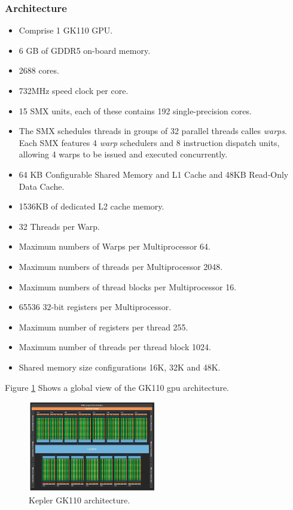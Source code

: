 \subsubsection{Architecture}
\begin{itemize}
    \item Comprise 1 GK110 GPU\cite{gpu_specs}.
    \item 6 GB of GDDR5 on-board memory\cite{gpu_specs}.
    \item 2688 cores\cite{gpu_specs}.
    \item 732MHz speed clock per core\cite{gpu_specs}.
    \item 15 SMX units, each of these contains 192 single-precision cores\cite{gpu_specs1}.
    \item The SMX schedules threads in groups of 32 parallel threads calles \emph{warps}. Each SMX features 4 \emph{warp}
        schedulers and 8 instruction dispatch units, allowing 4 warps to be issued and executed concurrently\cite{gpu_specs1}.
    \item 64 KB Configurable Shared Memory and L1 Cache and 48KB Read‐Only Data Cache\cite{gpu_specs1}.
    \item 1536KB of dedicated L2 cache memory\cite{gpu_specs1}.
    \item 32 Threads per Warp\cite{gpu_specs1}.
    \item Maximum numbers of Warps per Multiprocessor 64\cite{gpu_specs1}.
    \item Maximum numbers of threads per Multiprocessor 2048\cite{gpu_specs1}.
    \item Maximum numbers of thread blocks per Multiprocessor 16\cite{gpu_specs1}.
    \item 65536 32-bit registers per Multiprocessor\cite{gpu_specs1}.
    \item Maximum number of registers per thread 255\cite{gpu_specs1}.
    \item Maximum number of threads per thread block 1024\cite{gpu_specs1}.
    \item Shared memory size configurations 16K, 32K and 48K\cite{gpu_specs1}.
\end{itemize}

\par{Figure \ref{GpuArch} Shows a global view of the GK110 gpu architecture.}

\begin{figure}[!h]
    \centering
    \includegraphics[width=0.5\textwidth]{figures/gpu_arch.png}
    \caption{Kepler GK110 architecture\cite{gpu_specs1}.}
    \label{GpuArch}
\end{figure}

